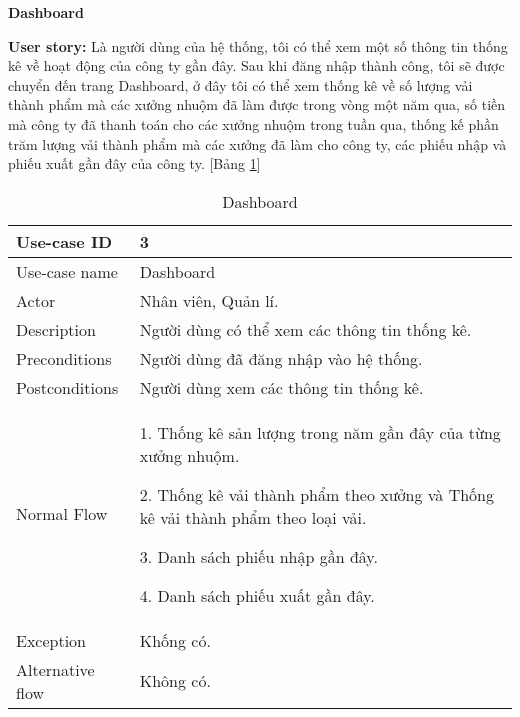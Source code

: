 \textbf{Dashboard}\par
\textbf{User story:} Là người dùng của hệ thống, tôi có thể xem một số thông tin thống kê về hoạt động của công ty gần đây. Sau khi đăng nhập thành công, tôi sẽ được chuyển đến trang Dashboard, ở đây tôi có thể xem thống kê về số lượng vải thành phẩm mà các xưởng nhuộm đã làm được trong vòng một năm qua, số tiền mà công ty đã thanh toán cho các xưởng nhuộm trong tuần qua, thống kế phần trăm lượng vải thành phẩm mà các xưởng đã làm cho công ty, các phiếu nhập và phiếu xuất gần đây của công ty. [Bảng \ref{bang14}]
\begin{table}[H]
    \centering
    \begin{tabular}{|m{3cm}|m{10cm}|}
    \hline 
        Use-case ID & 3\\ \hline
        Use-case name & Dashboard\\ \hline
        Actor & Nhân viên, Quản lí.\\ \hline
        Description & Người dùng có thể xem các thông tin thống kê.\\ \hline
        Preconditions & Người dùng đã đăng nhập vào hệ thống.\\ \hline
        Postconditions & Người dùng xem các thông tin thống kê.\\ \hline
        Normal Flow & 
        1. Thống kê sản lượng trong năm gần đây của từng xưởng nhuộm.\par
        2. Thống kê vải thành phẩm theo xưởng và Thống kê vải thành phẩm theo loại vải.\par
        3. Danh sách phiếu nhập gần đây.\par
        4. Danh sách phiếu xuất gần đây.
        \\ \hline
        Exception & Khống có.\\ \hline
        Alternative flow & Không có.\\ 
    \hline 
    \end{tabular}
    \caption{Dashboard}
    \label{bang14}
\end{table}


